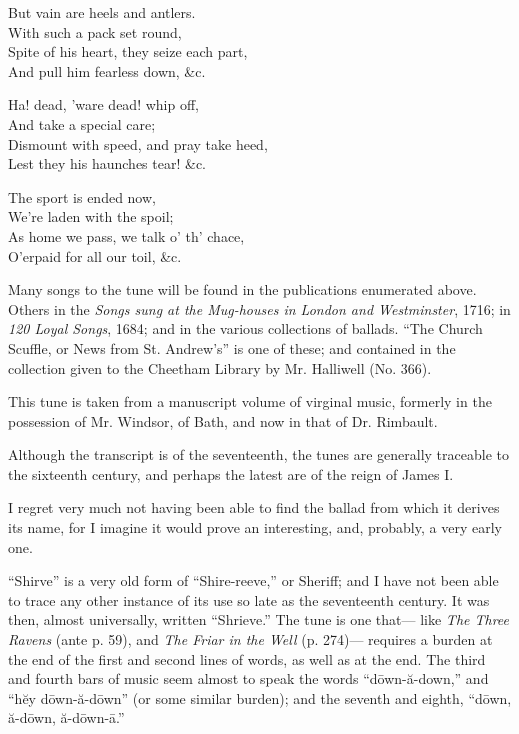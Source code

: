 \begin{dcverse}
\begin{altverse}
But vain are heels and antlers.\\
With such a pack set round,\\
Spite of his heart, they seize each part,\\
And pull him fearless down, \&c.
\end{altverse}

\begin{altverse}
Ha! dead, ’ware dead! whip off,\\
And take a special care;\\
Dismount with speed, and pray take heed,\\
Lest they his haunches tear! \&c.
\end{altverse}

\begin{altverse}
The sport is ended now,\\
We’re laden with the spoil;\\
As home we pass, we talk o’ th’ chace,\\
O’erpaid for all our toil, \&c.
\end{altverse}
\end{dcverse}

Many songs to the tune will be found in the publications enumerated above.
Others in the \textit{Songs sung at the Mug-houses in London and Westminster}, 1716; in
\textit{120 Loyal Songs}, 1684; and in the various collections of ballads. “The Church
Scuffle, or News from St. Andrew’s” is one of these; and contained in the collection
given to the Cheetham Library by Mr. Halliwell (No. 366).


This tune is taken from a manuscript volume of virginal music, formerly in
the possession of Mr. Windsor, of Bath, and now in that of Dr. Rimbault.

Although the transcript is of the seventeenth, the tunes are generally traceable
to the sixteenth century, and perhaps the latest are of the reign of James I.

I regret very much not having been able to find the ballad from which it
derives its name, for I imagine it would prove an interesting, and, probably, a
very early one.

“Shirve” is a very old form of “Shire-reeve,” or Sheriff; and I have not
been able to trace any other instance of its use so late as the seventeenth century.
It was then, almost universally, written “Shrieve.” The tune is one that—
like \textit{The Three Ravens} (ante p. 59), and \textit{The Friar in the Well} (p. 274)—
requires a burden at the end of the first and second lines of words, as well as at
the end. The third and fourth bars of music seem almost to speak the words
“dōwn-ă-down,” and “hĕy dōwn-ă-dōwn” (or some similar burden); and the
seventh and eighth, “dōwn, ă-dōwn, ă-dōwn-ā.”

